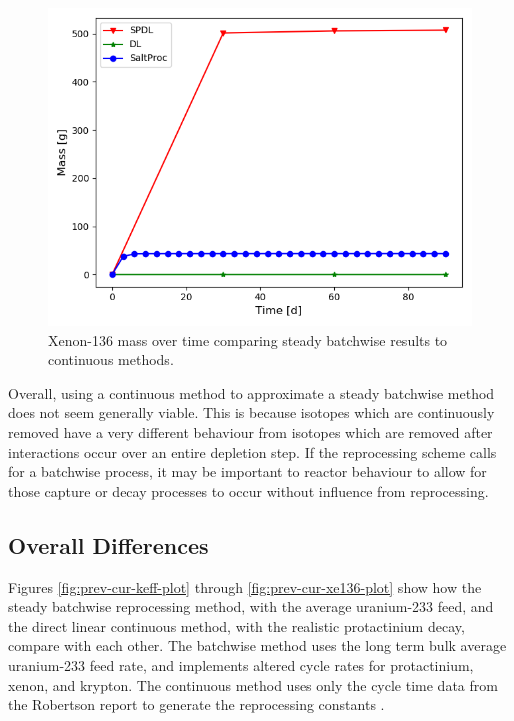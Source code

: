 \begin{figure}[H]
  \centering
  \includegraphics[scale=0.7]{images/soln-1-2-xe136.png}
  \caption{Xenon-136 mass over time comparing steady batchwise results to continuous methods.}
   \label{fig:steady-compare-xe136}
\end{figure}

Overall, using a continuous method to approximate a steady batchwise method does not seem generally viable. This is because isotopes which are continuously removed have a very different behaviour from isotopes which are removed after interactions occur over an entire depletion step. If the reprocessing scheme calls for a batchwise process, it may be important to reactor behaviour to allow for those capture or decay processes to occur without influence from reprocessing.

\subsection{Overall Differences}

Figures \ref{fig:prev-cur-keff-plot} through  \ref{fig:prev-cur-xe136-plot} show how the steady batchwise reprocessing method, with the average uranium-233 feed, and the direct linear continuous method, with the realistic protactinium decay, compare with each other.
The batchwise method uses the long term bulk average uranium-233 feed rate, and implements altered cycle rates for protactinium, xenon, and krypton. The continuous method uses only the cycle time data from the Robertson report to generate the reprocessing constants \cite{robertson_conceptual_1971}.

